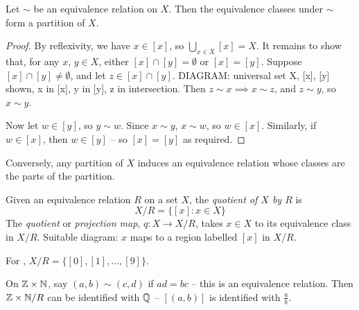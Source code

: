 \documentclass{../../template/note}
\begin{document}
    \begin{theorem}
        Let \(\sim\) be an equivalence relation on \(X\). Then the equivalence classes under \(\sim\) form a partition of \(X\).
    \end{theorem}
    
    \begin{proof}
        By reflexivity, we have \(x \in [x]\), so \(\bigcup_{x \in X} [x] = X\). It remains to show that, for any \(x\), \(y \in X\), either \([x] \cap [y] = \emptyset\) or \([x] = [y]\). Suppose \([x] \cap [y] \neq \emptyset\), and let \(z \in [x] \cap [y]\). DIAGRAM: universal set X, [x], [y] shown, x in [x], y in [y], z in intersection. Then \(z \sim x \implies x \sim z\), and \(z \sim y\), so \(x \sim y\).

        Now let \(w \in [y]\), so \(y \sim w\). Since \(x \sim y\), \(x \sim w\), so \(w \in [x]\). Similarly, if \(w \in [x]\), then \(w \in [y]\) -- so \([x] = [y]\) as required.

    \end{proof}
    
    \begin{remark*}
        Conversely, any partition of \(X\) induces an equivalence relation whose classes are the parts of the partition.
    \end{remark*}
    
    \begin{definition}
        Given an equivalence relation \(R\) on a set \(X\), the \emph{quotient of \(X\) by \(R\)} is
        \[
            X/R = \{[x]: x \in X\}
        \]
        The \emph{quotient} or \emph{projection map}, \(q: X \to X/R\), takes \(x \in X\) to its equivalence class in \(X/R\).
        Suitable diagram: \(x\) maps to a region labelled \([x]\) in \(X/R\).
    \end{definition}
    
    \begin{example}
        For , \(X/R = \{[0], [1], \dots, [9]\}\).
    \end{example}
    
    \begin{example}
        On \(\mathbb Z \times \mathbb N\), say \((a, b) \sim (c, d)\) if \(ad = bc\) -- this is an equivalence relation. Then \(\mathbb Z \times \mathbb N / R\) can be identified with \(\mathbb Q\) -- \([(a, b)]\) is identified with \(\frac{a}{b}\).
    \end{example}
    
\end{document}
